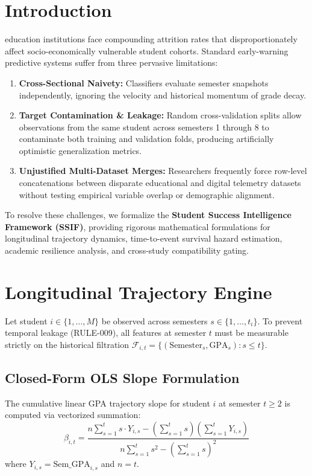 \documentclass[10pt,journal,compsoc]{IEEEtran}
\begin{document}
\maketitle
\IEEEdisplaynontitleabstractindextext
\IEEEpeerreviewmaketitle

\section{Introduction}
 education institutions face compounding attrition rates that disproportionately affect socio-economically vulnerable student cohorts. Standard early-warning predictive systems suffer from three pervasive limitations:
\begin{enumerate}
    \item \textbf{Cross-Sectional Naivety:} Classifiers evaluate semester snapshots independently, ignoring the velocity and historical momentum of grade decay.
    \item \textbf{Target Contamination \& Leakage:} Random cross-validation splits allow observations from the same student across semesters 1 through 8 to contaminate both training and validation folds, producing artificially optimistic generalization metrics.
    \item \textbf{Unjustified Multi-Dataset Merges:} Researchers frequently force row-level concatenations between disparate educational and digital telemetry datasets without testing empirical variable overlap or demographic alignment.
\end{enumerate}

To resolve these challenges, we formalize the \textbf{Student Success Intelligence Framework (SSIF)}, providing rigorous mathematical formulations for longitudinal trajectory dynamics, time-to-event survival hazard estimation, academic resilience analysis, and cross-study compatibility gating.

\section{Longitudinal Trajectory Engine}
\label{sec:trajectories}
Let student $i \in \{1, \dots, M\}$ be observed across semesters $s \in \{1, \dots, t_i\}$. To prevent temporal leakage (RULE-009), all features at semester $t$ must be measurable strictly on the historical filtration $\mathcal{F}_{i,t} = \{(\text{Semester}_s, \text{GPA}_s) : s \le t\}$.

\subsection{Closed-Form OLS Slope Formulation}
The cumulative linear GPA trajectory slope for student $i$ at semester $t \ge 2$ is computed via vectorized summation:
\begin{equation}
\beta_{i,t} = \frac{n \sum_{s=1}^t s \cdot Y_{i,s} - \left(\sum_{s=1}^t s\right)\left(\sum_{s=1}^t Y_{i,s}\right)}{n \sum_{s=1}^t s^2 - \left(\sum_{s=1}^t s\right)^2}
\end{equation}
where $Y_{i,s} = \text{Sem\_GPA}_{i,s}$ and $n = t$. 
\end{document}
